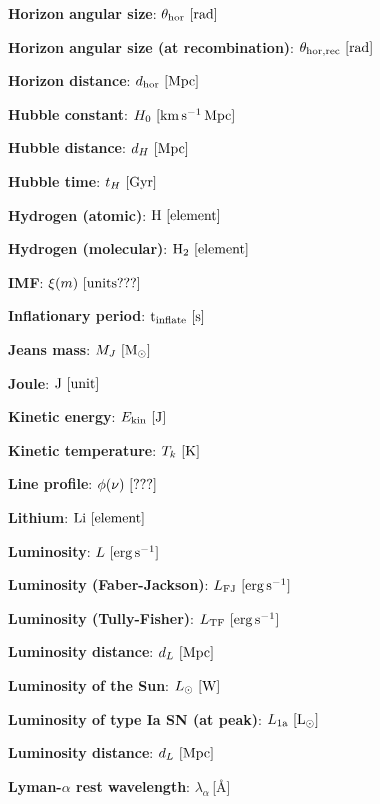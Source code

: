 \documentclass[a4paper,11pt]{article}
\begin{document}
{\noindent}\textbf{Horizon angular size}: $\theta_\mathrm{hor} ~ [{\rm rad}]$

{\noindent}\textbf{Horizon angular size (at recombination)}: $\theta_\mathrm{hor,rec} ~ [{\rm rad}]$

{\noindent}\textbf{Horizon distance}: $d_\mathrm{hor} ~ [{\rm Mpc}]$

{\noindent}\textbf{Hubble constant}: $H_0 ~ [{\rm km\,s^{-1}\,Mpc}]$

{\noindent}\textbf{Hubble distance}: $d_H ~ [{\rm Mpc}]$

{\noindent}\textbf{Hubble time}: $t_H ~ [{\rm Gyr}]$

{\noindent}\textbf{Hydrogen (atomic)}: ${\rm H} ~ [{\rm element}]$

{\noindent}\textbf{Hydrogen (molecular)}: ${\rm H_2} ~ [{\rm element}]$

{\noindent}\textbf{IMF}: $\xi(m) ~ [{\rm units???}]$

{\noindent}\textbf{Inflationary period}: ${\rm t_\mathrm{inflate}} ~ [{\rm s}]$

{\noindent}\textbf{Jeans mass}: $M_J ~ [{\rm M_\odot}]$

{\noindent}\textbf{Joule}: ${\rm J} ~ [{\rm unit}]$

{\noindent}\textbf{Kinetic energy}: $E_\mathrm{kin} ~ [{\rm J}]$

{\noindent}\textbf{Kinetic temperature}: $T_k ~ [{\rm K}]$

{\noindent}\textbf{Line profile}: $\phi(\nu) ~ [{\rm ???}]$

{\noindent}\textbf{Lithium}: ${\rm Li} ~ [{\rm element}]$

{\noindent}\textbf{Luminosity}: $L ~ [{\rm erg\,s^{-1}}]$

{\noindent}\textbf{Luminosity (Faber-Jackson)}: $L_\mathrm{FJ} ~ [{\rm erg\,s^{-1}}]$

{\noindent}\textbf{Luminosity (Tully-Fisher)}: $L_\mathrm{TF} ~ [{\rm erg\,s^{-1}}]$

{\noindent}\textbf{Luminosity distance}: $d_L ~ [{\rm Mpc}]$

{\noindent}\textbf{Luminosity of the Sun}: $L_\odot ~ [{\rm W}]$

{\noindent}\textbf{Luminosity of type Ia SN (at peak)}: $L_\mathrm{1a} ~ [{\rm L_\odot}]$

{\noindent}\textbf{Luminosity distance}: $d_L ~ [{\rm Mpc}]$

{\noindent}\textbf{Lyman-$\alpha$ rest wavelength}: $\lambda_\alpha$\,[\AA]
\end{document}
